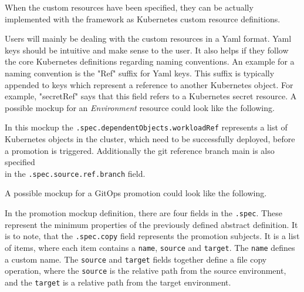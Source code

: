 
When the custom resources have been specified,
they can be actually implemented with the framework
as Kubernetes custom resource definitions.

Users will mainly be dealing with the custom resources in a Yaml format.
Yaml keys should be intuitive and make sense to the user.
It also helps if they follow the core Kubernetes definitions regarding naming conventions.
An example for a naming convention is the "Ref" suffix for Yaml keys.
This suffix is typically appended to keys which represent a reference to another Kubernetes
object.
For example, "secretRef" says that this field refers to a Kubernetes secret resource.
A possible mockup for an \textit{Environment} resource
could look like the following.

\newpage



In this mockup the \lstinline|.spec.dependentObjects.workloadRef|
represents a list of Kubernetes objects in the cluster,
which need to be successfully deployed,
before a promotion is triggered.
Additionally the git reference branch main is also specified \\
in the \lstinline|.spec.source.ref.branch| field.

A possible mockup for a GitOps promotion 
could look like the following.



In the promotion mockup definition,
there are four fields in the
\lstinline|.spec|.
These represent the minimum properties of the previously defined abstract definition.
It is to note, that
the \lstinline|.spec.copy| field represents the promotion subjects.
It is a list of items, where each item contains
a \lstinline|name|, \lstinline|source| and \lstinline|target|.
The \lstinline|name| defines a custom name.
The \lstinline|source| and \lstinline|target| fields together define a
file copy operation,
where the \lstinline|source| is the relative path from the source environment,
and the \lstinline|target| is a relative path from the target environment.

